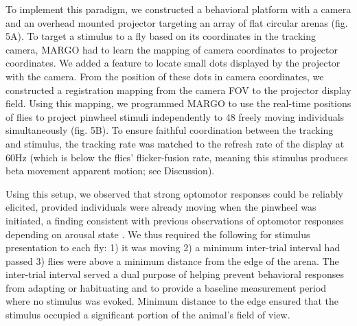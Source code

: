 \documentclass[10pt]{article}
\begin{document}
\begin{multicols}{2}
To implement this paradigm, we constructed a behavioral platform with a camera and an overhead mounted projector targeting an array of flat circular arenas (fig. 5A). To target a stimulus to a fly based on its coordinates in the tracking camera, MARGO had to learn the mapping of camera coordinates to projector coordinates. We added a feature to locate small dots displayed by the projector with the camera. From the position of these dots in camera coordinates, we constructed a registration mapping from the camera FOV to the projector display field. Using this mapping, we programmed MARGO to use the real-time positions of flies to project pinwheel stimuli independently to 48 freely moving individuals simultaneously (fig. 5B). To ensure faithful coordination between the tracking and stimulus, the tracking rate was matched to the refresh rate of the display at 60Hz (which is below the flies' flicker-fusion rate, meaning this stimulus produces beta movement apparent motion\cite{haag_arenz_serbe_gabbiani_borst_2016}; see Discussion). 

Using this setup, we observed that strong optomotor responses could be reliably elicited, provided individuals were already moving when the pinwheel was initiated, a finding consistent with previous observations of optomotor responses depending on arousal state \cite{Zhu_Peripheral_2009,Kim_Fly_2016}. We thus required the following for stimulus presentation to each fly: 1) it was moving 2) a minimum inter-trial interval had passed 3) flies were above a minimum distance from the edge of the arena. The inter-trial interval served a dual purpose of helping prevent behavioral responses from adapting or habituating and to provide a baseline measurement period where no stimulus was evoked. Minimum distance to the edge ensured that the stimulus occupied a significant portion of the animal's field of view. 


\end{multicols}
\end{document}
